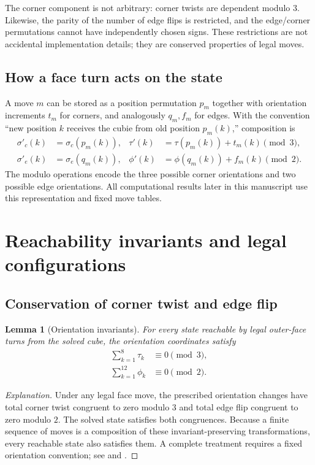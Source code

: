 \documentclass[11pt,a4paper]{article}
\newtheorem{lemma}[theorem]{Lemma}
\theoremstyle{definition}
\theoremstyle{remark}
\begin{document}
The corner component is not arbitrary: corner twists are dependent modulo $3$. Likewise, the parity of the number of edge flips is restricted, and the edge/corner permutations cannot have independently chosen signs. These restrictions are not accidental implementation details; they are conserved properties of legal moves.

\subsection{How a face turn acts on the state}
A move $m$ can be stored as a position permutation $p_m$ together with orientation increments $t_m$ for corners, and analogously $q_m,f_m$ for edges. With the convention ``new position $k$ receives the cubie from old position $p_m(k)$,'' composition is
\begin{align}
\sigma'_c(k)&=\sigma_c(p_m(k)), & \tau'(k)&=\tau(p_m(k))+t_m(k)\pmod 3,\\
\sigma'_e(k)&=\sigma_e(q_m(k)), & \phi'(k)&=\phi(q_m(k))+f_m(k)\pmod 2.
\end{align}
The modulo operations encode the three possible corner orientations and two possible edge orientations. All computational results later in this manuscript use this representation and fixed move tables.

\section{Reachability invariants and legal configurations}
\subsection{Conservation of corner twist and edge flip}
\begin{lemma}[Orientation invariants]
For every state reachable by legal outer-face turns from the solved cube, the orientation coordinates satisfy
\begin{align}\label{eq:orientations}
\sum_{k=1}^{8}\tau_k&\equiv0\pmod 3,\\
\sum_{k=1}^{12}\phi_k&\equiv0\pmod 2.
\end{align}
\end{lemma}
\begin{proof}[Explanation]
Under any legal face move, the prescribed orientation changes have total corner twist congruent to zero modulo $3$ and total edge flip congruent to zero modulo $2$. The solved state satisfies both congruences. Because a finite sequence of moves is a composition of these invariant-preserving transformations, every reachable state also satisfies them. A complete treatment requires a fixed orientation convention; see \citet{joyner2008} and \citet{kociemba2phase}.
\end{proof}
\end{document}

